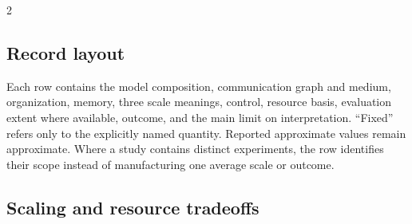 \begin{multicols}{2}
\subsection{Record layout}
Each row contains the model composition, communication graph and medium, organization, memory, three scale meanings, control, resource basis, evaluation extent where available, outcome, and the main limit on interpretation. ``Fixed'' refers only to the explicitly named quantity. Reported approximate values remain approximate. Where a study contains distinct experiments, the row identifies their scope instead of manufacturing one average scale or outcome.
\end{multicols}

\subsection{Scaling and resource tradeoffs}
\begingroup
\small
\setlength{\tabcolsep}{5pt}
\renewcommand{\arraystretch}{1.13}
